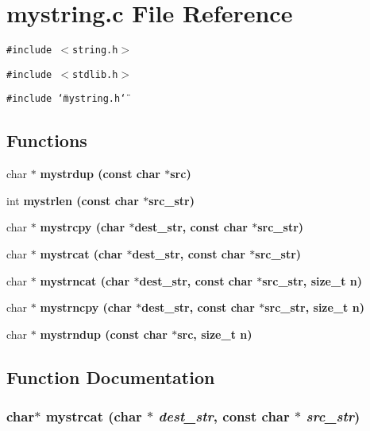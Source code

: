 \section{mystring.c File Reference}
\label{mystring_8c}
{\tt \#include $<$string.h$>$}\par
{\tt \#include $<$stdlib.h$>$}\par
{\tt \#include \char`\"{}mystring.h\char`\"{}}\par
\subsection*{Functions}
\begin{CompactItemize}
\item 
char $\ast$ \bf{mystrdup} (const char $\ast$src)
\item 
int \bf{mystrlen} (const char $\ast$src\_\-str)
\item 
char $\ast$ \bf{mystrcpy} (char $\ast$dest\_\-str, const char $\ast$src\_\-str)
\item 
char $\ast$ \bf{mystrcat} (char $\ast$dest\_\-str, const char $\ast$src\_\-str)
\item 
char $\ast$ \bf{mystrncat} (char $\ast$dest\_\-str, const char $\ast$src\_\-str, size\_\-t n)
\item 
char $\ast$ \bf{mystrncpy} (char $\ast$dest\_\-str, const char $\ast$src\_\-str, size\_\-t n)
\item 
char $\ast$ \bf{mystrndup} (const char $\ast$src, size\_\-t n)
\end{CompactItemize}


\subsection{Function Documentation}
\subsubsection{\setlength{\rightskip}{0pt plus 5cm}char$\ast$ mystrcat (char $\ast$ {\em dest\_\-str}, const char $\ast$ {\em src\_\-str})}\label{mystring_8c_c60bc6a9e3a25a7291fd602b6dcda2b8}


